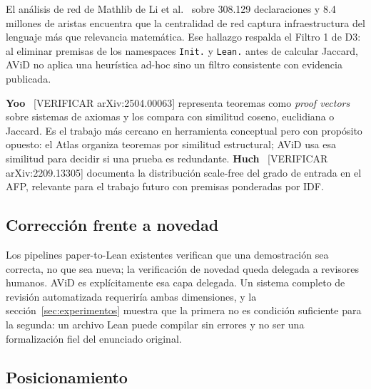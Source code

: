 \documentclass[12pt,a4paper]{article}
\theoremstyle{remark}
\begin{document}
El análisis de red de Mathlib de Li et al.~\cite{network2026} sobre 308.129 declaraciones y 8.4 millones de aristas encuentra que la centralidad de red captura infraestructura del lenguaje más que relevancia matemática. Ese hallazgo respalda el Filtro 1 de D3: al eliminar premisas de los namespaces \texttt{Init.} y \texttt{Lean.} antes de calcular Jaccard, AViD no aplica una heurística ad-hoc sino un filtro consistente con evidencia publicada.

\textbf{Yoo}~\cite{yoo2025} [VERIFICAR arXiv:2504.00063] representa teoremas como \textit{proof vectors} sobre sistemas de axiomas y los compara con similitud coseno, euclidiana o Jaccard. Es el trabajo más cercano en herramienta conceptual pero con propósito opuesto: el Atlas organiza teoremas por similitud estructural; AViD usa esa similitud para decidir si una prueba es redundante. \textbf{Huch}~\cite{huch2022} [VERIFICAR arXiv:2209.13305] documenta la distribución scale-free del grado de entrada en el AFP, relevante para el trabajo futuro con premisas ponderadas por IDF.

\subsection{Corrección frente a novedad}

Los pipelines paper-to-Lean existentes verifican que una demostración sea correcta, no que sea nueva; la verificación de novedad queda delegada a revisores humanos. AViD es explícitamente esa capa delegada. Un sistema completo de revisión automatizada requeriría ambas dimensiones, y la sección~\ref{sec:experimentos} muestra que la primera no es condición suficiente para la segunda: un archivo Lean puede compilar sin errores y no ser una formalización fiel del enunciado original.


\subsection{Posicionamiento}
\end{document}
